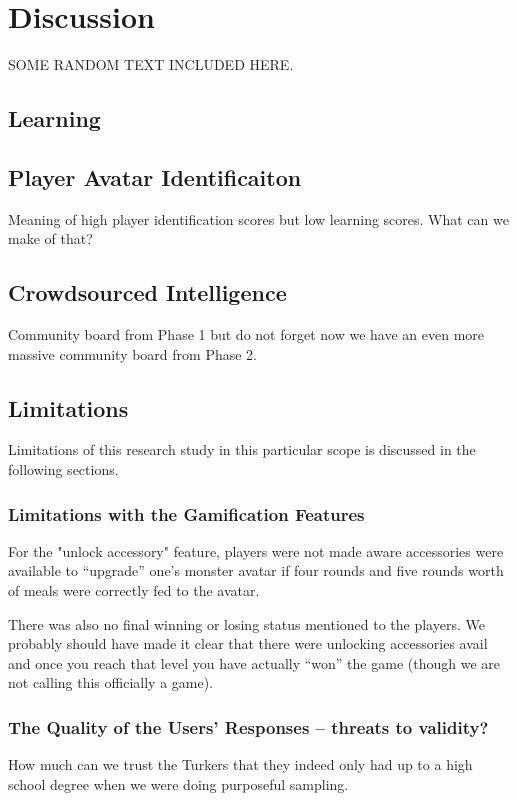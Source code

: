\section{Discussion}
SOME RANDOM TEXT INCLUDED HERE.

\subsection{Learning}

\subsection{Player Avatar Identificaiton}
Meaning of high player identification scores but low learning scores. What can we make of that?

\subsection{Crowdsourced Intelligence}

Community board from Phase 1 but do not forget now we have an even more massive community board from Phase 2. 

\subsection{Limitations}

Limitations of this research study in this particular scope is discussed in the following sections. 

\subsubsection{Limitations with the Gamification Features}

For the "unlock accessory" feature, players were not made aware accessories were available to ``upgrade'' one's monster avatar if four rounds and five rounds worth of meals were correctly fed to the avatar. 

There was also no final winning or losing status mentioned to the players. We probably should have made it clear that there were unlocking accessories avail and once you reach that level you have actually ``won'' the game (though we are not calling this officially a game). 



\subsubsection{The Quality of the Users' Responses -- threats to validity?}
How much can we trust the Turkers that they indeed only had up to a high school degree when we were doing purposeful sampling. 

